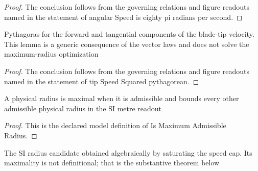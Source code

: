 \begin{proof}
  The conclusion follows from the governing relations and figure readouts named in the statement of angular Speed is eighty pi radians per second.
\end{proof}
\begin{lemma}
  \label{lem:physics:phyx-mini-0818:phyxminiproblems-problemphyxmini0818-tipspeedsquared-pythagorean}
  Pythagoras for the forward and tangential components of the blade-tip velocity. This lemma is a generic consequence of the vector laws and does not solve the maximum-radius optimization
\end{lemma}
\begin{proof}
  The conclusion follows from the governing relations and figure readouts named in the statement of tip Speed Squared pythagorean.
\end{proof}
\begin{definition}
  \label{def:physics:phyx-mini-0818:phyxminiproblems-problemphyxmini0818-ismaximumadmissibleradius}
  A physical radius is maximal when it is admissible and bounds every other admissible physical radius in the SI metre readout
\end{definition}
\begin{proof}
  This is the declared model definition of Is Maximum Admissible Radius.
\end{proof}
\begin{definition}
  \label{def:physics:phyx-mini-0818:phyxminiproblems-problemphyxmini0818-radiusfromsaturatedspeedbudgetmeters}
  The SI radius candidate obtained algebraically by saturating the speed cap. Its maximality is not definitional; that is the substantive theorem below
\end{definition}
